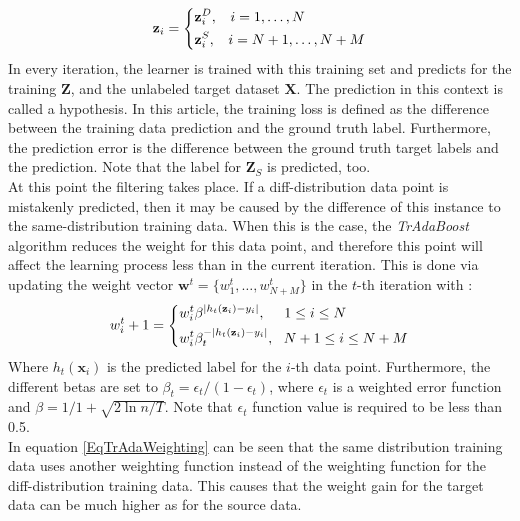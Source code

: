 \begin{equation*}
	\mathbf{z}_i = \begin{dcases}
						\mathbf{z}_i^D, \>\>\>\> i = 1,\dots,N\\
						\mathbf{z}_i^S, \>\>\>\> i = N +1,\dots,N+M
			  	   \end{dcases}
\end{equation*}
In every iteration, the learner is trained with this training set and predicts for the training $\mathbf{Z}$, and the unlabeled target dataset $\mathbf{X}$.
The prediction in this context is called a hypothesis.
In this article, the training loss is defined as the difference between the training data prediction and the ground truth label.
Furthermore, the prediction error is the difference between the ground truth target labels and the prediction.
Note that the label for $\mathbf{Z}_S$ is predicted, too.\cite{Dai.}\\
At this point the filtering takes place.
If a diff-distribution data point is mistakenly predicted, then it may be caused by the difference of this instance to the same-distribution training data.
When this is the case, the \textit{TrAdaBoost} algorithm reduces the weight for this data point, and therefore this point will affect the learning process less than in the current iteration.
This is done via updating the weight vector $\mathbf{w}^t=\{w_1^t,\dots,w_{N+M}^t\}$ in the $t$-th iteration with \cite{Dai.}:
\begin{equation}\label{EqTrAdaWeighting}
	w_i^t+1=\begin{dcases}
				w_i^t\beta^{\vert h_t(\mathbf{z}_i )-y_i\vert}, \>\>\>\>\>\> 1\le i \le N \\
				w_i^t\beta_t^{-\vert h_t(\mathbf{z}_i )-y_i\vert}, \>\>\> N+1\le i \le N+M
			 \end{dcases}
\end{equation}
Where $ h_t(\mathbf{x}_i )$ is the predicted label for the $i$-th data point.
Furthermore, the different betas are set to $\beta_t = \epsilon_t / (1-\epsilon_t)$, where $\epsilon_t$ is a weighted error function and $\beta= 1 / 1 + \sqrt{2\ln n/T}$.
Note that $\epsilon_t$ function value is required to be less than 0.5.\\
In equation \eqref{EqTrAdaWeighting} can be seen that the same distribution training data uses another weighting function instead of the weighting function for the diff-distribution training data.
This causes that the weight gain for the target data can be much higher as for the source data.\\
